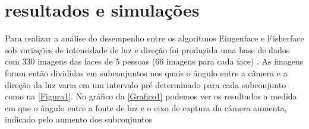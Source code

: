 

\section*{resultados e simulações}

	Para realizar a análise do desempenho entre os algoritmos Eingenface e Fisherface sob variações de intensidade de luz e direção foi produzida uma base de dados com 330 imagens das faces de 5 pessoas (66 imagens para cada face) \cite{fisherfaces}. As imagens foram então divididas em subconjuntos nos quais o ângulo entre a câmera e a direção da luz varia em um intervalo pré determinado para cada subconjunto como na \autoref{Figura1}. No gráfico da \autoref{Grafico1} podemos ver os resultados a medida em que o ângulo entre a fonte de luz e o eixo de captura da câmera aumenta, indicado pelo aumento dos subconjuntos
		

